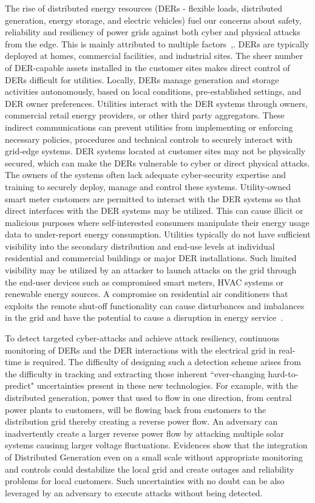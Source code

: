 \documentclass[conference]{IEEEtran}
\begin{document}
The rise of distributed energy resources (DERs - flexible loads, distributed generation, energy storage, and electric vehicles) fuel our concerns about safety, reliability and resiliency of power grids against both cyber and physical attacks from the edge. This is mainly attributed to multiple factors~\cite{Rasche:IGCTD2015},\cite{Lee:NESCOR2013}. DERs are typically deployed at homes, commercial facilities, and industrial sites. The sheer number of DER-capable assets installed in the customer sites makes direct control of DERs difficult for utilities. Locally, DERs manage generation and storage activities autonomously, based on local conditions, pre-established settings, and DER owner preferences. Utilities interact with the DER systems through owners, commercial retail energy providers, or other third party aggregators. These indirect communications can prevent utilities from implementing or enforcing necessary policies, procedures and technical controls to securely interact with grid-edge systems. DER systems located at customer sites may not be physically secured, which can make the DERs vulnerable to cyber or direct physical attacks. The owners of the systems often lack adequate cyber-security expertise and training to securely deploy, manage and control these systems. Utility-owned smart meter customers are permitted to interact with the DER systems so that direct interfaces with the DER systems may be utilized. This can cause illicit or malicious purposes where self-interested consumers manipulate their energy usage data to under-report energy consumption. Utilities typically do not have sufficient visibility into the secondary distribution and end-use levels at individual residential and commercial buildings or major DER installations. Such limited visibility may be utilized by an attacker to launch attacks on the grid through the end-user devices such as compromised smart meters, HVAC systems or renewable energy sources. A compromise on residential air conditioners that exploits the remote shut-off functionality can cause disturbances and imbalances in the grid and have the potential to cause a disruption in energy service~\cite{howtohack:2016}. 

To detect targeted cyber-attacks and achieve attack resiliency, continuous monitoring of  DERs and the DER interactions with the electrical grid in real-time is required.  The difficulty of designing such a detection scheme arises from the difficulty in tracking and extracting those inherent ``ever-changing hard-to-predict" uncertainties present in these new technologies. For example, with the distributed generation, power that used to flow in one direction, from central power plants to customers, will be flowing back from customers to the distribution grid thereby creating a reverse power flow. An adversary can inadvertently create a larger reverse power flow by attacking multiple solar systems causinng larger voltage fluctuations.  Evidences show that the integration of Distributed Generation even on a small scale without appropriate monitoring and controls could destabilize the local grid and create outages and reliability problems for local customers. Such uncertainties with no doubt can be also leveraged by an adversary to execute attacks without being detected.  
\end{document}
